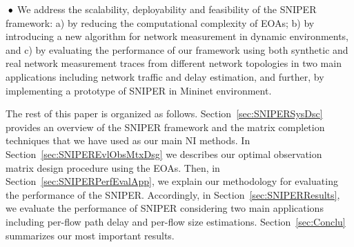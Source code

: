 \textbf{$\text{\hspace{0.1cm}}\bullet$} We address the scalability, deployability and feasibility of the SNIPER framework: a) by reducing the computational complexity of EOAs; b) by introducing a new algorithm for network measurement in dynamic environments, and c) by evaluating the performance of our framework using both synthetic and real network measurement traces from different network topologies in two main applications including network traffic and delay estimation, and further, by implementing a prototype of SNIPER in Mininet environment.

The rest of this paper is organized as follows. Section~\ref{sec:SNIPERSysDsc} provides an overview of the SNIPER framework and
the matrix completion techniques that we have used as our main NI methods.  In Section~\ref{sec:SNIPEREvlObsMtxDsg} we describes our
optimal observation matrix design procedure using the EOAs. Then, in Section~\ref{sec:SNIPERPerfEvalApp}, we explain our methodology for evaluating the performance of the SNIPER. Accordingly, in Section~\ref{sec:SNIPERResults}, we evaluate the performance of SNIPER considering two main applications including per-flow path delay and per-flow size estimations. Section~\ref{sec:Conclu} summarizes our most important results.
